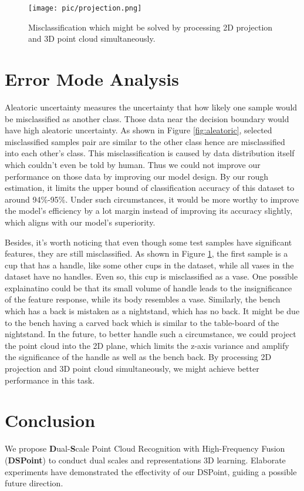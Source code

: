 \documentclass[sigconf]{acmart}
\begin{document}
\begin{figure}[t]
	\centering
  \texttt{[image: pic/projection.png]}
	\caption{Misclassification which might be solved by processing 2D projection and 3D point cloud simultaneously.}
	  \label{fig:projection}
	  		  \vspace{-1cm}
  \end{figure}
  
\section{Error Mode Analysis}


Aleatoric uncertainty measures the uncertainty that how likely one sample would be misclassified as another class. Those data near the decision boundary would have high aleatoric uncertainty. As shown in Figure \ref{fig:aleatoric}, selected misclassified samples pair are similar to the other class hence are misclassified into each other's class. This misclassification is caused by data distribution itself which couldn't even be told by human. Thus we could not improve our performance on those data by improving our model design. By our rough estimation, it limits the upper bound of classification accuracy of this dataset to around 94\%-95\%. Under such circumstances, it would be more worthy to improve the model's efficiency by a lot margin instead of improving its accuracy slightly, which aligns with our model's superiority.

Besides, it's worth noticing that even though some test samples have significant features, they are still misclassified. As shown in Figure \ref{fig:projection}, the first sample is a cup that has a handle, like some other cups in the dataset, while all vases in the dataset have no handles. Even so, this cup is misclassified as a vase. One possible explainatino could be that its small volume of handle leads to the insignificance of the feature response, while its body resembles a vase. Similarly, the bench which has a back is mistaken as a nightstand, which has no back. It might be due to the bench having a carved back which is similar to the table-board of the nightstand. In the future, to better handle such a circumstance, we could project the point cloud into the 2D plane, which limits the z-axis variance and amplify the significance of the handle as well as the bench back. By processing 2D projection and 3D point cloud simultaneously, we might achieve better performance in this task. 



\section{Conclusion}
\label{sec:conclusion}
We propose \textbf{D}ual-\textbf{S}cale Point Cloud Recognition with High-Frequency Fusion (\textbf{DSPoint}) to conduct dual scales and representations 3D learning. Elaborate experiments have demonstrated the effectivity of our DSPoint, guiding a possible future direction.





\end{document}
